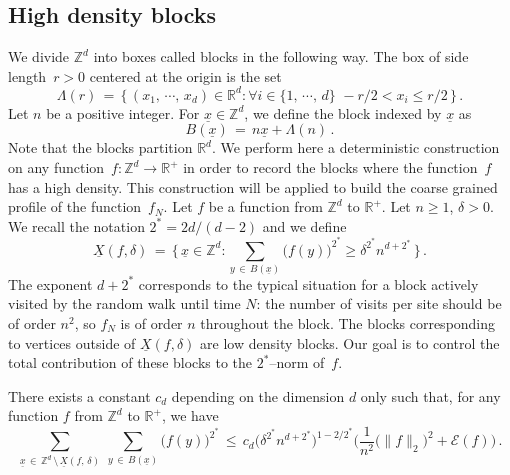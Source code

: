 \documentclass[AHL, Unicode, longabstracts, published]{cedram}
\newcommand{\XX}{{\underline{X}}}
\newcommand{\xx}{{\underline{x}}}
\newcommand*\Zd {{\mathbb Z^d}}
\newcommand*\Rd {{\mathbb R^d}}
\newcommand*\R{\mathbb{R}}
\newcommand*\La {{\Lambda}}
\newcommand{\cE}{\mathcal{E}}
\let\oldforall\forall
\renewcommand*{\forall}{\mathrel{\oldforall}}
\begin{document}
\subsection{High density blocks}\label{deco}
We divide $\Zd$ into boxes called blocks in the following way. The box of side length~$r>0$ centered at the origin is the set
\[
\Lambda(r) \,=\, \big\{\,(x_1,\,\cdots,\,x_d)\in\R^d :
\forall i\in \{1,\,\cdots,\,d\}\,\, -r/2<x_i\leq r/2
\,\big\}\,.
\]
Let $n$ be a positive integer. For $\xx\in \Zd$, we define the block indexed by $\xx$ as
\[
B(\xx)\, =\, n\xx+\La(n)\,.
\]
Note that the blocks partition $\Rd$. We perform here a deterministic construction on any function~$f:\Zd\to\R^+$ in order to record the blocks where the function~$f$ has a high density. This construction will be applied to build the coarse grained profile of the function~$f_N$. Let $f$ be a function from $\Zd$ to $\R^+$. Let $n\geq1$, $\delta>0$. We recall the notation $2^*=2d/(d-2)$ and we define
\[
\XX(f,\delta)\,=\,\Big\{\,\xx\in\Zd:
\sum_{y\,\in\,B(\xx)}\big(f(y)\big)^{2^*}\geq
\delta^{2^*} n^{d+2^*}
\,\Big\}\,.
\]
The exponent $d+2^*$ corresponds to the typical situation for a block actively visited by the random walk until time $N$: the number of visits per site should be of order $n^2$, so $f_N$ is of order $n$ throughout the block. The blocks corresponding to vertices outside of $\XX(f,\delta)$ are low density blocks. Our goal is to control the total contribution of these blocks to the $2^*$--norm of~$f$.
\begin{lemm}\label{contout}
There exists a constant $c_d$ depending on the dimension $d$ only such that, for any function $f$ from $\Zd$ to $\R^+$, we have
\[
\sum_{\xx\,\in\,\Zd\,\setminus\,\XX(f,\,\delta)}\:
\sum_{y\,\in\,B(\xx)}
\big(f(y)\big)^{2^*}\,\leq\, c_d\big(
\delta^{2^*} n^{d+2^*}
\big)^{1-2/2^*}
\bigg(\frac{1}{n^2}
\big(\|f\|_{2}\big)^2+{\cE(f)}\bigg)\,.
\]
\end{lemm}
\end{document}
